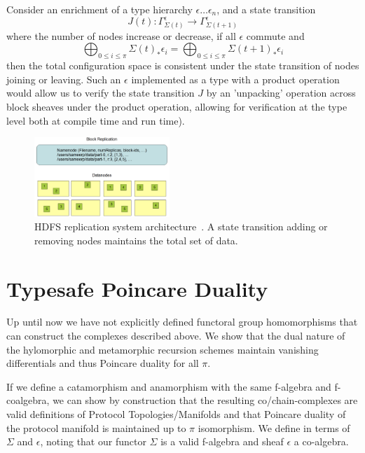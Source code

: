 \documentclass[runningheads]{llncs}
\begin{document}
Consider an enrichment of a type hierarchy $\epsilon \dots \epsilon_{n}$, and a state transition
\begin{equation}
J(t): \Gamma^\epsilon_{\Sigma(t)} \rightarrow \Gamma^\epsilon_{\Sigma(t + 1)} 
\end{equation}
where the number of nodes increase or decrease, if all $\epsilon$ commute and 
\begin{equation}
\bigoplus_{0 \leq i \leq \pi} \Sigma(t)_* \epsilon_i = \bigoplus_{0 \leq i \leq \pi} \Sigma(t+1)_* \epsilon_i
\end{equation}
then the total configuration space is consistent under the state transition of nodes joining or leaving. Such an $\epsilon$ implemented as a type with a product operation~\cite{ref_url2} would allow us to verify the state transition $J$ by an ’unpacking’ operation across block sheaves under the product operation, allowing for verification at the type level both at compile time and run time). 
\begin{figure}
\centering
\includegraphics[height=3cm,width=0.55\columnwidth]{HDFS-replication.png}
\caption{HDFS replication system architecture~\cite{ref_url7}. A state transition adding or removing nodes maintains the total set of data.} \label{fig2}
\end{figure}

\section{Typesafe Poincare Duality}
Up until now we have not explicitly defined functoral group homomorphisms that can construct the complexes described above. We show that the dual nature of the hylomorphic and metamorphic recursion schemes maintain vanishing differentials and thus Poincare duality for all $\pi$.

If we define a catamorphism and anamorphism with the same f-algebra and f-coalgebra, we can show by construction that the resulting co/chain-complexes are valid definitions of Protocol Topologies/Manifolds and that Poincare duality of the protocol manifold is maintained up to $\pi$ isomorphism. We define in terms of $\Sigma$ and $\epsilon$, noting that our functor $\Sigma$ is a valid f-algebra and sheaf $\epsilon$ a co-algebra.
\end{document}
